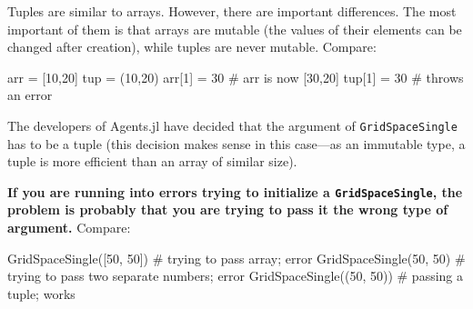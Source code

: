 \documentclass[
  letterpaper,
  DIV=11,
  numbers=noendperiod]{scrartcl}
\newenvironment{Shaded}{\begin{snugshade}}{\end{snugshade}}
\newcommand{\CommentTok}[1]{\textcolor[rgb]{0.37,0.37,0.37}{#1}}
\newcommand{\FloatTok}[1]{\textcolor[rgb]{0.68,0.00,0.00}{#1}}
\newcommand{\FunctionTok}[1]{\textcolor[rgb]{0.28,0.35,0.67}{#1}}
\newcommand{\NormalTok}[1]{\textcolor[rgb]{0.00,0.23,0.31}{#1}}
\newcommand{\OperatorTok}[1]{\textcolor[rgb]{0.37,0.37,0.37}{#1}}
\begin{document}
\begin{tcolorbox}[enhanced jigsaw, breakable, title=\textcolor{quarto-callout-note-color}{\faInfo}\hspace{0.5em}{Tuples and arrays}, bottomrule=.15mm, coltitle=black, toprule=.15mm, titlerule=0mm, colframe=quarto-callout-note-color-frame, toptitle=1mm, opacityback=0, colbacktitle=quarto-callout-note-color!10!white, rightrule=.15mm, bottomtitle=1mm, arc=.35mm, leftrule=.75mm, opacitybacktitle=0.6, colback=white, left=2mm]

Tuples are similar to arrays. However, there are important differences.
The most important of them is that arrays are mutable (the values of
their elements can be changed after creation), while tuples are never
mutable. Compare:

\begin{Shaded}
\begin{Highlighting}[]
\NormalTok{arr }\OperatorTok{=}\NormalTok{ [}\FloatTok{10}\NormalTok{,}\FloatTok{20}\NormalTok{]}
\NormalTok{tup }\OperatorTok{=}\NormalTok{ (}\FloatTok{10}\NormalTok{,}\FloatTok{20}\NormalTok{)}
\NormalTok{arr[}\FloatTok{1}\NormalTok{] }\OperatorTok{=} \FloatTok{30}   \CommentTok{\# arr is now [30,20]}
\NormalTok{tup[}\FloatTok{1}\NormalTok{] }\OperatorTok{=} \FloatTok{30}   \CommentTok{\# throws an error}
\end{Highlighting}
\end{Shaded}

The developers of Agents.jl have decided that the argument of
\texttt{GridSpaceSingle} has to be a tuple (this decision makes sense in
this case---as an immutable type, a tuple is more efficient than an
array of similar size).

\textbf{If you are running into errors trying to initialize a
\texttt{GridSpaceSingle}, the problem is probably that you are trying to
pass it the wrong type of argument.} Compare:

\begin{Shaded}
\begin{Highlighting}[]
\FunctionTok{GridSpaceSingle}\NormalTok{([}\FloatTok{50}\NormalTok{, }\FloatTok{50}\NormalTok{])   }\CommentTok{\# trying to pass array; error}
\FunctionTok{GridSpaceSingle}\NormalTok{(}\FloatTok{50}\NormalTok{, }\FloatTok{50}\NormalTok{)     }\CommentTok{\# trying to pass two separate numbers; error}
\FunctionTok{GridSpaceSingle}\NormalTok{((}\FloatTok{50}\NormalTok{, }\FloatTok{50}\NormalTok{))   }\CommentTok{\# passing a tuple; works}
\end{Highlighting}
\end{Shaded}

\end{tcolorbox}
\end{document}
